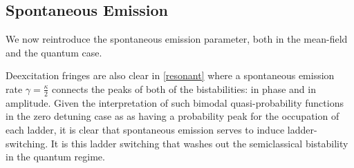 \subsection{Spontaneous Emission}
We now reintroduce the spontaneous emission parameter, both in the mean-field and the quantum case. 

Deexcitation fringes are also clear in \cref{resonant} where a spontaneous emission rate $ \gamma = \frac{\kappa}{2}$ connects the peaks of both of the bistabilities: in phase and in amplitude. Given the interpretation of such bimodal quasi-probability functions in the zero detuning case as as having a probability peak for the occupation of each ladder, it is clear that spontaneous emission serves to induce ladder-switching. It is this ladder switching that washes out the semiclassical bistability in the quantum regime.

